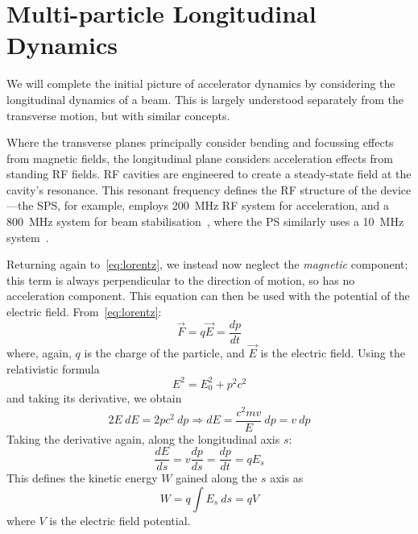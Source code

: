 \documentclass[11pt]{report}
\begin{document}
\section{Multi-particle Longitudinal Dynamics}

We will complete the initial picture of accelerator dynamics by considering the longitudinal dynamics of a beam. This is largely understood separately from the transverse motion, but with similar concepts.

Where the transverse planes principally consider bending and focussing effects from magnetic fields, the longitudinal plane considers acceleration effects from standing RF fields. RF cavities are engineered to create a steady-state field at the cavity's resonance. This resonant frequency defines the RF structure of the device---the SPS, for example, employs \qty{200}{\mega\hertz} RF system for acceleration, and a \qty{800}{\mega\hertz} system for beam stabilisation~\cite{spsrf}, where the PS similarly uses a \qty{10}{\mega\hertz} system~\cite{psrf}.

Returning again to~\autoref{eq:lorentz}, we instead now neglect the \textit{magnetic} component; this term is always perpendicular to the direction of motion, so has no acceleration component. This equation can then be used with the potential of the electric field. From~\autoref{eq:lorentz}:
\begin{equation}
  \vec F = q\vec E = \frac{dp}{dt}
\end{equation} where, again, $q$ is the charge of the particle, and $\vec E$ is the electric field. Using the relativistic formula
\begin{equation}
  E^2=E_0^2 + p^2c^2
  \label{eq:rel_long}
\end{equation} and taking its derivative, we obtain 
\begin{equation}
  2E\ dE = 2pc^2\ dp \Rightarrow dE = \frac{c^2mv}{E}\ dp = v\ dp
\end{equation}
Taking the derivative again, along the longitudinal axis $s$:
\begin{equation}
  \frac{dE}{ds} = v\frac{dp}{ds} = \frac{dp}{dt} = qE_s
\end{equation}
This defines the kinetic energy $W$ gained along the $s$ axis as 
\begin{equation}
  W=q\int E_s \ ds =qV
\end{equation} where $V$ is the electric field potential.
\end{document}
